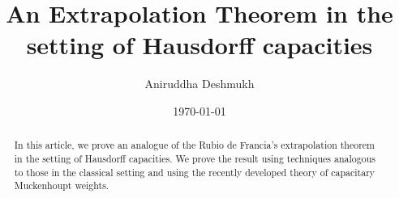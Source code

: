 \documentclass{amsart}
\numberwithin{theorem}{section}
\numberwithin{equation}{section}
\begin{document}
	\title[Extrapolation on capacitary spaces]{An Extrapolation Theorem in the setting of Hausdorff capacities}
	\author[A Deshmukh]{Aniruddha Deshmukh}
	\address{Department of Mathematics, Indian Institute of Technology Indore, Khandwa Road, Simrol, Indore, Madhya Pradesh-453552, India.}
	\date{\today}
	\begin{abstract}
In this article, we prove an analogue of the Rubio de Francia's extrapolation theorem in the setting of Hausdorff capacities. We prove the result using techniques analogous to those in the classical setting and using the recently developed theory of capacitary Muckenhoupt weights.
\end{abstract}
\maketitle
\end{document}
